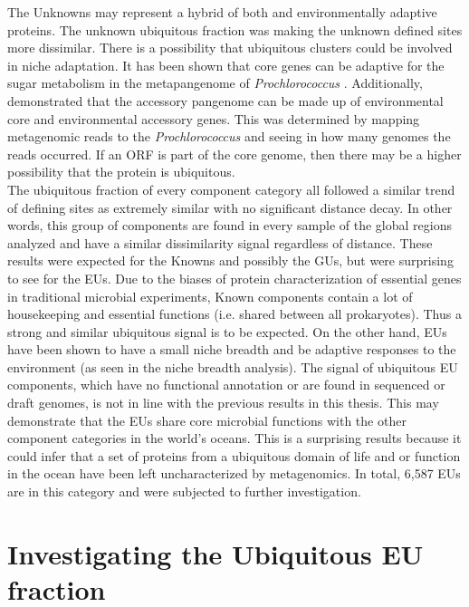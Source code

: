 The Unknowns may represent a hybrid of both  and environmentally adaptive proteins. The unknown ubiquitous fraction was making the unknown defined sites more dissimilar. There is a possibility that ubiquitous clusters could be involved in niche adaptation. It has been shown that core genes can be adaptive for the sugar metabolism in the metapangenome of \textit{Prochlorococcus} \citep{Delmont_2018}. Additionally, \cite{Delmont_2018} demonstrated that the accessory pangenome can be made up of environmental core and environmental accessory genes. This was determined by mapping metagenomic reads to the \textit{Prochlorococcus} and seeing in how many genomes the reads occurred. If an ORF is part of the core genome, then there may be a higher possibility that the protein is ubiquitous.\\

The ubiquitous fraction of every component category all followed a similar trend of defining sites as extremely similar with no significant distance decay. In other words, this group of components are found in every sample of the global regions analyzed and have a similar dissimilarity signal regardless of distance. These results were expected for the Knowns and possibly the GUs, but were surprising to see for the EUs. Due to the biases of protein characterization of essential genes in traditional microbial experiments, Known components contain a lot of housekeeping and essential functions (i.e. shared between all prokaryotes). Thus a strong and similar ubiquitous signal is to be expected. On the other hand, EUs have been shown to have a small niche breadth and be adaptive responses to the environment (as seen in the niche breadth analysis). The signal of ubiquitous EU components, which have no functional annotation or are found in sequenced or draft genomes, is not in line with the previous results in this thesis. This may demonstrate that the EUs share core microbial functions with the other component categories in the world's oceans. This is a surprising results because it could infer that a set of proteins from a ubiquitous domain of life and or function in the ocean have been left uncharacterized by metagenomics. In total, 6,587 EUs are in this category and were subjected to further investigation. \\

\section{Investigating the Ubiquitous EU fraction}

